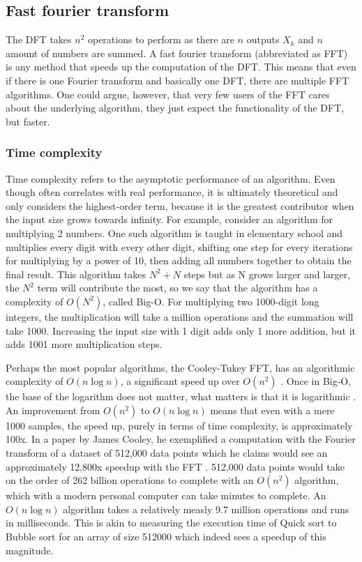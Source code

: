 \subsection{Fast fourier transform}
The DFT takes $n^2$ operations to perform as there are $n$ outputs $X_k$ and $n$ amount of numbers are summed. A fast fourier transform (abbreviated as FFT) is any method that speeds up the computation of the DFT. This means that even if there is one Fourier transform and basically one DFT, there are multiple FFT algorithms. One could argue, however, that very few users of the FFT cares about the underlying algorithm, they just expect the functionality of the DFT, but faster. 

\subsubsection{Time complexity}
Time complexity refers to the asymptotic performance of an algorithm. Even though often correlates with real performance, it is ultimately theoretical and only considers the highest-order term, because it is the greatest contributor when the input size grows towards infinity. For example, consider an algorithm for multiplying 2 numbers. One such algorithm is taught in elementary school and multiplies every digit with every other digit, shifting one step for every iterations for multiplying by a power of 10, then adding all numbers together to obtain the final result. This algorithm takes $N^2+N$ steps but as N grows larger and larger, the $N^2$ term will contribute the most, so we say that the algorithm has a complexity of $O(N^2)$, called Big-O. For multiplying two 1000-digit long integers, the multiplication will take a million operations and the summation will take 1000. Increasing the input size with 1 digit adds only 1 more addition, but it adds 1001 more multiplication steps.

Perhaps the most popular algorithms, the Cooley-Tukey FFT, has an algorithmic complexity of $O(n \log n)$, a significant speed up over $O(n^2)$ \cite{Randhawa2018} \cite{HeidemanEtAl1984}. Once in Big-O, the base of the logarithm does not matter, what matters is that it is logarithmic . An improvement from $O(n^2)$ to $O(n \log n)$ means that even with a mere 1000 samples, the speed up, purely in terms of time complexity, is approximately 100x. In a paper by James Cooley, he exemplified a computation with the Fourier transform of a dataset of 512,000 data points which he claims would see an approximately 12,800x speedup with the FFT \cite{Cooley1987}. 512,000 data points would take on the order of 262 billion operations to complete with an $O(n^2)$ algorithm, which with a modern personal computer can take minutes to complete. An $O(n \log n)$ algorithm takes a relatively measly 9.7 million operations and runs in milliseconds. This is akin to measuring the execution time of Quick sort to Bubble sort for an array of size 512000 which indeed sees a speedup of this magnitude.

